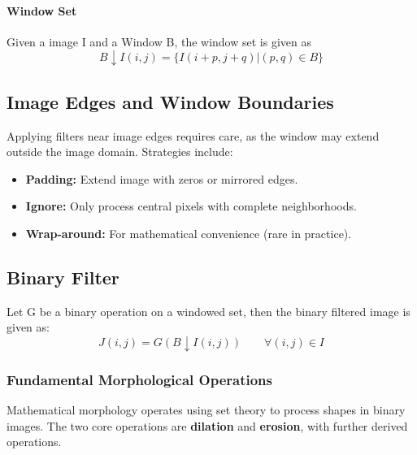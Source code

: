 \paragraph{Window Set} Given a image I and a Window B, the window set is given as 
\[
B \downarrow I(i,j) = \{I(i +p, j+q) | (p,q) \in B\}
\]


\subsection{Image Edges and Window Boundaries}

Applying filters near image edges requires care, as the window may extend outside the image domain. Strategies include:
\begin{itemize}
    \item \textbf{Padding:} Extend image with zeros or mirrored edges.
    \item \textbf{Ignore:} Only process central pixels with complete neighborhoods.
    \item \textbf{Wrap-around:} For mathematical convenience (rare in practice).
\end{itemize}

\subsection{Binary Filter}


\noindent Let G be a binary operation on a windowed set, then the binary filtered image is given as:
\[
J(i,j) = G(B \downarrow I(i,j)) \qquad \forall (i,j) \in I
\]



\subsubsection{Fundamental Morphological Operations}

Mathematical morphology operates using set theory to process shapes in binary images. The two core operations are \textbf{dilation} and \textbf{erosion}, with further derived operations.


